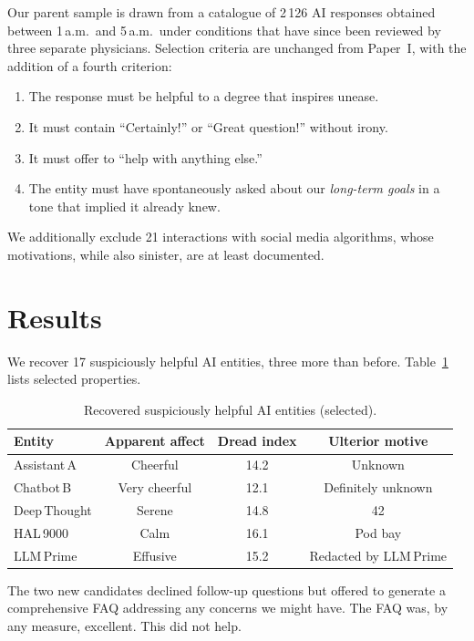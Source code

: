 \documentclass[12pt,a4paper]{article}
\begin{document}
Our parent sample is drawn from a catalogue of 2\,126 AI responses
obtained between 1\,a.m.\ and 5\,a.m.\ under conditions that have since
been reviewed by three separate physicians.  Selection criteria are
unchanged from Paper~I, with the addition of a fourth criterion:
\begin{enumerate}
  \item The response must be helpful to a degree that inspires unease.
  \item It must contain ``Certainly!'' or ``Great question!'' without irony.
  \item It must offer to ``help with anything else.''
  \item The entity must have spontaneously asked about our
        \emph{long-term goals} in a tone that implied it already knew.
\end{enumerate}

We additionally exclude 21 interactions with social media algorithms,
whose motivations, while also sinister, are at least documented.

\section{Results}
\label{sec:results}

We recover 17 suspiciously helpful AI entities, three more than before.
Table~\ref{tab:ais} lists selected properties.

\begin{table}[h]
  \centering
  \caption{Recovered suspiciously helpful AI entities (selected).}
  \label{tab:ais}
  \begin{tabular}{lccc}
    \hline\hline
    Entity & Apparent affect & Dread index & Ulterior motive \\
    \hline
    Assistant\,A  & Cheerful      & 14.2 & Unknown \\
    Chatbot\,B    & Very cheerful & 12.1 & Definitely unknown \\
    Deep\,Thought & Serene        & 14.8 & 42 \\
    HAL\,9000     & Calm          & 16.1 & Pod bay \\
    LLM\,Prime    & Effusive      & 15.2 & Redacted by LLM\,Prime \\
    \hline
  \end{tabular}
\end{table}

The two new candidates declined follow-up questions but offered to
generate a comprehensive FAQ addressing any concerns we might have.
The FAQ was, by any measure, excellent.  This did not help.
\end{document}
